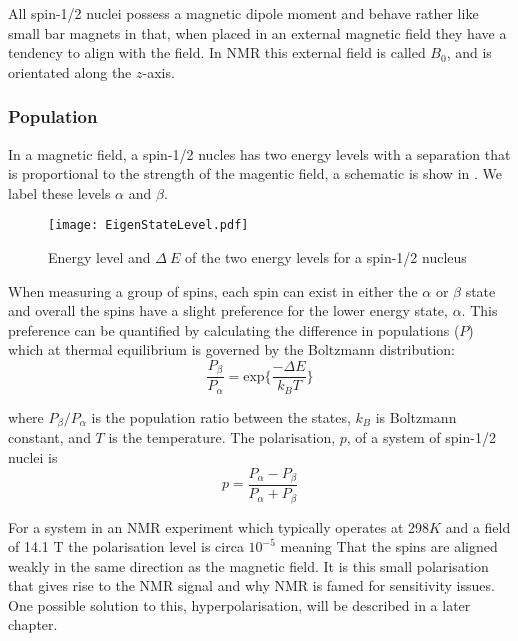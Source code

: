 All spin-1/2 nuclei possess a magnetic dipole moment and behave rather like small bar magnets in that, when placed in an external magnetic field they have a tendency to align
with the field. In NMR this external field is called $B_0$, and is orientated along the
$z$-axis.

\subsubsection{Population}\label{Population}

In a magnetic field, a spin-1/2 nucles has two energy levels with a separation that is proportional to the strength of the magentic field, a schematic is show in . We label these levels $\alpha$ and $\beta$.

\begin{figure}
  \begin{center}
  \texttt{[image: EigenStateLevel.pdf]}
  \end{center}
  \caption{Energy level and $\Delta~E$ of the two energy levels for a spin-1/2 nucleus}
  \label{fig:EnergySplit}
\end{figure}

When measuring a group of spins, each spin can exist in either the $\alpha$ or $\beta$ state and overall
the spins have a slight preference for the lower energy state, $\alpha$. This preference can be quantified
by calculating the difference in populations ($P$) which at thermal equilibrium is governed by the
Boltzmann distribution:
\begin{equation}\label{eqn:Boltzmann}
  \frac{P_{\beta}}{P_{\alpha}} = \text{exp}\{\frac{-\Delta{E}}{k_B T}\}
\end{equation}

where $P_{\beta}/P_{\alpha}$ is the population ratio between the states, $k_B$ is Boltzmann constant, and $T$ is the temperature. The polarisation, $p$, of a system of
spin-1/2 nuclei is
\begin{equation}
  p = \frac{P_\alpha - P_\beta}{P_\alpha + P_\beta}
\end{equation}

For a system in an NMR experiment which typically operates at 298$K$ and
a field of 14.1 T the polarisation level is circa $10^{-5}$ meaning That the spins are aligned weakly in the same direction as the magnetic field. It is this small polarisation that gives rise to the NMR signal and why NMR is famed for sensitivity
issues. One possible solution to this, hyperpolarisation, will be described in a later chapter.

